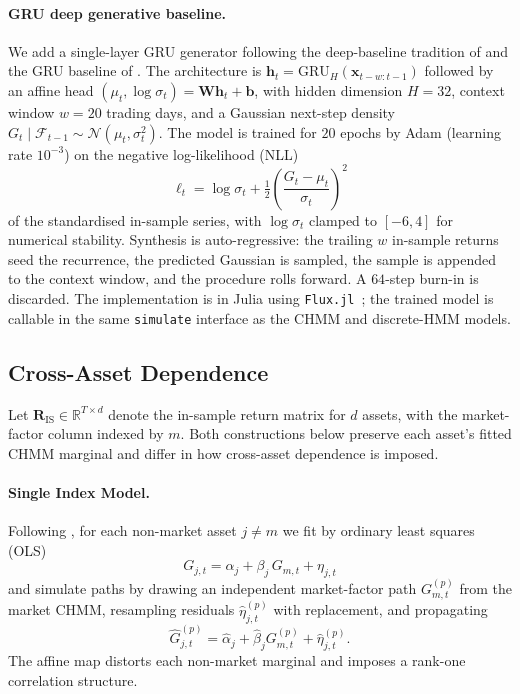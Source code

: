 \paragraph{GRU deep generative baseline.}
\label{sec:gru_methods}%
We add a single-layer GRU generator following the deep-baseline tradition of \citet{yoon2019timegan} and the GRU baseline of \citet{alswaidan2026hybrid}.
The architecture is $\mathbf{h}_t = \mathrm{GRU}_{H}(\mathbf{x}_{t-w:t-1})$ followed by an affine head $(\mu_t, \log \sigma_t) = \mathbf{W} \mathbf{h}_t + \mathbf{b}$, with hidden dimension $H = 32$, context window $w = 20$ trading days, and a Gaussian next-step density $G_t \mid \mathcal{F}_{t-1} \sim \mathcal{N}(\mu_t, \sigma_t^2)$.
The model is trained for $20$ epochs by Adam (learning rate $10^{-3}$) on the negative log-likelihood (NLL)
\begin{equation}
    \ell_t = \log \sigma_t + \tfrac{1}{2}\!\left(\frac{G_t - \mu_t}{\sigma_t}\right)^2
    \label{eq:gru_nll}
\end{equation}
of the standardised in-sample series, with $\log \sigma_t$ clamped to $[-6, 4]$ for numerical stability.
Synthesis is auto-regressive: the trailing $w$ in-sample returns seed the recurrence, the predicted Gaussian is sampled, the sample is appended to the context window, and the procedure rolls forward.
A $64$-step burn-in is discarded.
The implementation is in Julia using \texttt{Flux.jl}~\cite{innes2018flux}; the trained model is callable in the same \texttt{simulate} interface as the CHMM and discrete-HMM models.

\subsection{Cross-Asset Dependence}
\label{sec:cross_asset_methods}

Let $\mathbf{R}_{\text{IS}} \in \mathbb{R}^{T \times d}$ denote the in-sample return matrix for $d$ assets, with the market-factor column indexed by $m$.
Both constructions below preserve each asset's fitted CHMM marginal and differ in how cross-asset dependence is imposed.

\paragraph{Single Index Model.}
Following \citet{sharpe1963simplified}, for each non-market asset $j \neq m$ we fit by ordinary least squares (OLS)
\begin{equation}
    G_{j,t} = \alpha_j + \beta_j\, G_{m,t} + \eta_{j,t}
    \label{eq:sim}
\end{equation}
and simulate paths by drawing an independent market-factor path $G_{m,t}^{(p)}$ from the market CHMM, resampling residuals $\hat{\eta}_{j,t}^{(p)}$ with replacement, and propagating
\begin{equation}
    \hat{G}_{j,t}^{(p)} = \hat\alpha_j + \hat\beta_j G_{m,t}^{(p)} + \hat\eta_{j,t}^{(p)}.
    \label{eq:sim_sim}
\end{equation}
The affine map distorts each non-market marginal and imposes a rank-one correlation structure.

